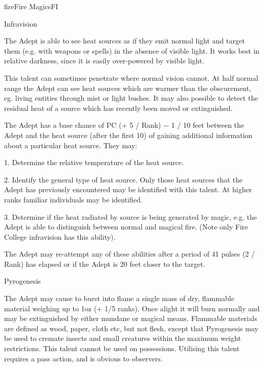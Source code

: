 \begin{College}[2.0]{fire}{Fire Magics}{FI}
\begin{talent}[T-1]{Infravision}
\begin{effects}
The Adept is able to see heat sources as if they emit normal light and
target them (e.g.  with weapons or spells) in the absence of visible
light. It works best in relative darkness, since it is easily
over-powered by visible light.

This talent can sometimes penetrate where normal vision cannot. At
half normal range the Adept can see heat sources which are warmer than
the obscurement, eg.  living entities through mist or light bushes.
It may also possible to detect the residual heat of a source which has
recently been moved or extinguished.

The Adept has a base chance of PC (+ 5 / Rank) − 1 / 10 feet between
the Adept and the heat source (after the first 10) of gaining
additional information about a particular heat source. They may:

1. Determine the relative temperature of the heat source.

2. Identify the general type of heat source.  Only those heat sources
that the Adept has previously encountered may be identified with this
talent.  At higher ranks familiar individuals may be identified.

3. Determine if the heat radiated by source is being generated by
magic, e.g.  the Adept is able to distinguish between normal and
magical fire.  (Note only Fire College infravision has this ability).

The Adept may re-attempt any of these abilities after a period of 41
pulses (2 / Rank) has elapsed or if the Adept is 20 feet closer to the
target.
\end{effects}
\end{talent}

\begin{talent}[T-2]{Pyrogenesis}

\begin{effects}
The Adept may cause to burst into flame a single mass of dry,
flammable material weighing up to 1oz (+ 1/5 ranks). Once alight it
will burn normally and may be extinguished by either mundane or
magical means.  Flammable materials are defined as wood, paper, cloth
etc, but not flesh, except that Pyrogenesis may be used to cremate
insects and small creatures within the maximum weight restrictions.
This talent cannot be used on possessions. Utilising this talent
requires a pass action, and is obvious to observers.
\end{effects}
\end{talent}


\end{College}
